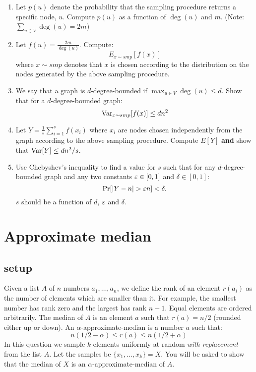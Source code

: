 \begin{enumerate}
\item Let $p(u)$ denote the probability that the sampling procedure returns a specific
node, $u$. Compute $p(u)$ as a function of $\deg(u)$ and $m$. (Note:
$\sum_{u \in V} \deg(u) = 2m$)
\item Let $f(u) = \frac{2m}{\deg(u)}$. Compute:
\[
E_{x \sim smp} [f(x)]
\]
where $x \sim smp$ denotes that $x$ is chosen according to the
distribution on the nodes generated by the above sampling procedure.
\item We say that a graph is $d$-degree-bounded if $\max_{u \in V} \deg(u) \le
d$. Show that for a $d$-degree-bounded graph:
\[
{\operatorname{Var}}_{x \sim smp} [f(x)] \le dn^2
\]
\item Let $Y = \frac{1}{s}\sum_{i=1}^{s} f(x_i)$ where $x_i$ are
nodes chosen independently from the graph according to the above
sampling procedure. Compute $E[Y]$ {\bf and} show that ${\operatorname{Var}}[Y] \le
dn^2/s$.
\item Use Chebyshev's inequality to find a value for $s$ such that 
for any $d$-degree-bounded graph and any two constants $\varepsilon \in
[0,1]$ and $\delta \in [0,1]$:
\[
\Pr[|Y - n| > \varepsilon n ] < \delta.
\]
$s$ should be a function of $d$, $\varepsilon$ and $\delta$.

\end{enumerate}
\pagebreak






\section{Approximate median}
\subsection*{setup}
Given a list $A$ of $n$ numbers $a_1,\ldots,a_n$, we define the rank
of an element $r(a_i)$ as the number of elements which are smaller
than it. For example, the smallest number has rank zero and the
largest has rank $n-1$. Equal elements are ordered arbitrarily. The
median of $A$ is an element $a$ such that $r(a) = n/2$ (rounded
either up or down). An $\alpha$-approximate-median is a number $a$
such that:
\[
n(1/2 - \alpha) \le r(a) \le n(1/2 + \alpha)
\]
In this question we sample $k$ elements uniformly at random {\it
with replacement} from the list $A$. Let the samples be
$\{x_1,\ldots,x_k\} = X$. You will be asked to show that the median of
$X$ is an $\alpha$-approximate-median of $A$.

